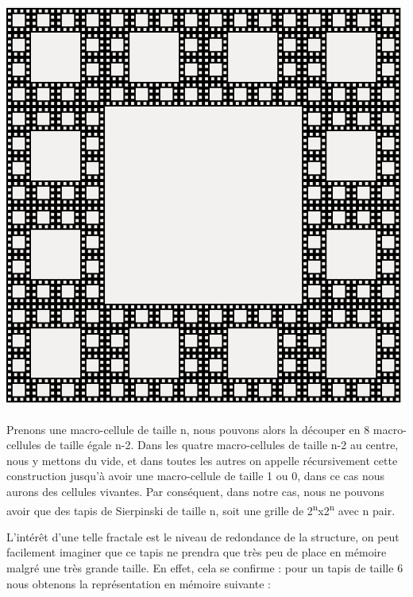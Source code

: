 \documentclass[a4paper,12pt]{report}
\begin{document}
\begin{center}
\includegraphics[scale=0.5]{carpet.jpg}
\end{center}

Prenons une macro-cellule de taille n, nous pouvons alors la découper
en 8 macro-cellules de taille égale n-2. Dans les quatre
macro-cellules de taille n-2 au centre, nous y mettons du vide, et
dans toutes les autres on appelle récursivement cette construction
jusqu'à avoir une macro-cellule de taille 1 ou 0, dans ce cas nous
aurons des cellules vivantes. Par conséquent, dans notre cas, nous ne
pouvons avoir que des tapis de Sierpinski de taille n, soit une grille
de 2\textsuperscript{n}x2\textsuperscript{n} avec n pair.

L'intérêt d'une telle fractale est le niveau de redondance de la
structure, on peut facilement imaginer que ce tapis ne prendra que
très peu de place en mémoire malgré une très grande taille. En effet,
cela se confirme : pour un tapis de taille 6 nous
obtenons la représentation en mémoire suivante :
\end{document}
